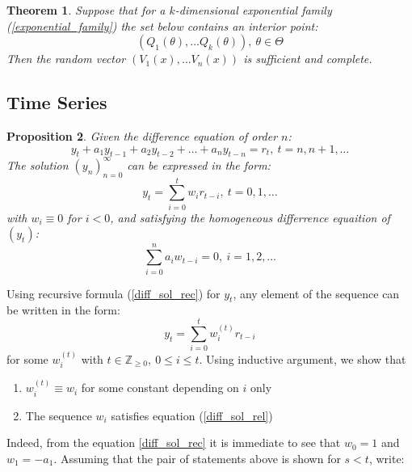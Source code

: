 \documentclass[12pt]{article}
\newtheorem{theorem}{Theorem}[section]
\newtheorem{proposition}[theorem]{Proposition}
\theoremstyle{definition}
\theoremstyle{remark}
\numberwithin{equation}{section}
\newcommand{\ZZ}{\mathbb{Z}}
\begin{document}
\begin{theorem}
	Suppose that for a $k$-dimensional exponential family (\ref{exponential_family}) the set below contains an interior point:
\begin{equation*}
	(Q_1(\theta),\ldots Q_k(\theta)),\ \theta\in\Theta
\end{equation*}
Then the random vector $\left(V_1(x),\ldots V_n(x)\right)$ is sufficient and complete.
\end{theorem}


\subsection{Time Series}

\begin{proposition}\label{diff_sol}
	Given the difference equation of order $n$:
	\begin{equation}\label{diff_sol_rec}
		y_t + a_1y_{t-1} + a_2y_{t-2} + \ldots + a_ny_{t-n} = r_t, \ t = n, n+1, \ldots
	\end{equation}
	The solution $\left(y_n\right)_{n = 0}^{\infty}$ can be expressed in the form:
	\begin{equation*}
		y_t =  \sum_{i = 0}^t w_ir_{t-i}, \ t = 0, 1, \ldots
	\end{equation*}
	with $w_i\equiv0$ for $i<0$, and satisfying the homogeneous differrence equaition of $(y_t)$:
	\begin{equation}\label{diff_sol_rel}
		\sum_{i = 0}^n a_iw_{t-i} = 0,\ i = 1, 2,\ldots
	\end{equation}

\end{proposition}
\proof
Using recursive formula (\ref{diff_sol_rec}) for $y_t$, any element of the sequence can be written in the form:
\begin{equation*}
	y_t = \sum_{i = 0}^t w_i^{(t)} r_{t-i}
\end{equation*}
for some $w_i^{(t)}$ with $t\in\ZZ_{\geq 0},\ 0\leq i\leq t$.
Using inductive argument, we show that
\begin{enumerate}
	\item $w_i^{(t)}\equiv w_i$ for some constant depending on $i$ only
	\item The sequence $w_i$ satisfies equation (\ref{diff_sol_rel})
\end{enumerate}

Indeed, from the equation \ref{diff_sol_rec} it is immediate to see that $w_0 = 1$ and $w_1 = -a_1$. Assuming that the pair of statements above is shown for $s < t$, write:
\end{document}
